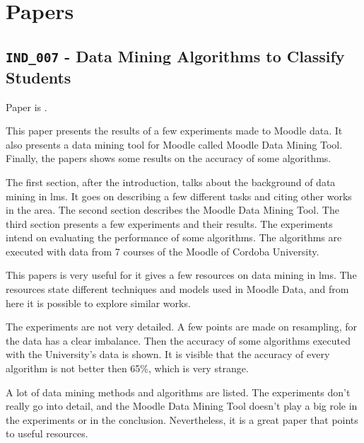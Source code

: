 \section{Papers}

\subsection{\texttt{IND\_007} - Data Mining Algorithms to Classify Students}

Paper is \cite{ind_007}.

This paper presents the results of a few experiments made to Moodle data. It
also presents a data mining tool for Moodle called Moodle Data Mining Tool.
Finally, the papers shows some results on the accuracy of some algorithms.

The first section, after the introduction, talks about the background of data
mining in \gls{lms}. It goes on describing a few different tasks and citing
other works in the area. The second section describes the Moodle Data Mining
Tool. The third section presents a few experiments and their results. The
experiments intend on evaluating the performance of some algorithms. The
algorithms are executed with data from 7 courses of the Moodle of Cordoba
University.

This papers is very useful for it gives a few resources on data mining in
\gls{lms}. The resources state different techniques and models used in Moodle
Data, and from here it is possible to explore similar works.

The experiments are not very detailed. A few points are made on resampling, for
the data has a clear imbalance. Then the accuracy of some algorithms executed
with the University's data is shown. It is visible that the accuracy of every
algorithm is not better then 65\%, which is very strange.

A lot of data mining methods and algorithms are listed. The experiments don't
really go into detail, and the Moodle Data Mining Tool doesn't play a big role
in the experiments or in the conclusion. Nevertheless, it is a great paper that
points to useful resources.
